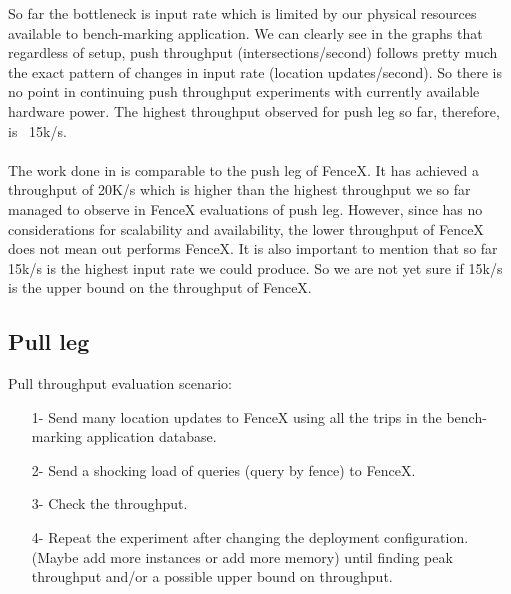 \documentclass[a4]{report}
\begin{document}
    So far the bottleneck is input rate which is limited by our physical resources available to bench-marking
    application.
    We can clearly see in the graphs that regardless of setup, push throughput (intersections/second) follows pretty
    much the exact pattern of changes in input rate (location updates/second).
    So there is no point in continuing push throughput experiments with currently available hardware power.
    The highest throughput observed for push leg so far, therefore, is ~15k/s.

    \paragraph{}
    The work done in \cite{Nechifor_Comnac_2013} is comparable to the push leg of FenceX.
    It has achieved a throughput of 20K/s which is higher than the highest throughput we so far managed to observe in
    FenceX evaluations of push leg.
    However, since \cite{Nechifor_Comnac_2013} has no considerations for scalability and availability, the lower
    throughput of FenceX does not mean \cite{Nechifor_Comnac_2013} out performs FenceX.
    It is also important to mention that so far 15k/s is the highest input rate we could produce.
    So we are not yet sure if 15k/s is the upper bound on the throughput of FenceX.

    \subsection{Pull leg}
    Pull throughput evaluation scenario:
    \begin{itemize}
        \item[1-] Send many location updates to FenceX using all the trips in the bench-marking application database.
        \item[2-] Send a shocking load of queries (query by fence) to FenceX.
        \item[3-] Check the throughput.
        \item[4-] Repeat the experiment after changing the deployment configuration. (Maybe add more instances or add
        more memory) until finding peak throughput and/or a possible upper bound on throughput.
    \end{itemize}
\end{document}
